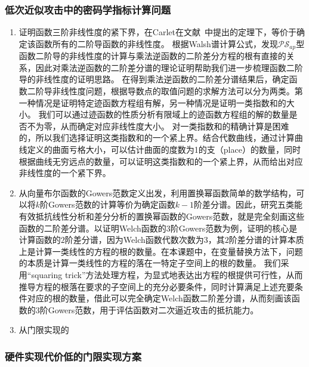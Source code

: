\documentclass[a4paper,zihao=-4,AutoFakeBold]{ctexart}
\begin{document}
\subsubsection{低次近似攻击中的密码学指标计算问题}
\begin{enumerate}[label=(\arabic{*})]
    \item 证明函数三阶非线性度的紧下界，在Carlet在文献~\cite{CC08IT}中提出的定理下，等价于确定该函数所有的二阶导函数的非线性度。
    根据Walsh谱计算公式，发现$\mathcal{PS}_{ap}$型函数二阶导的非线性度的计算与乘法逆函数的二阶差分方程的根有直接的关系，因此对乘法逆函数的二阶差分谱的理论证明帮助我们进一步梳理函数二阶导的非线性度的证明思路。
    在得到乘法逆函数的二阶差分谱结果后，确定函数二阶导非线性度问题，根据导数点的取值问题的求解方法可以分为两类。第一种情况是证明特定迹函数方程组有解，另一种情况是证明一类指数和的大小。
    我们可以通过迹函数的性质分析有限域上的迹函数方程组的解的数量是否不为零，从而确定对应非线性度大小。
    对一类指数和的精确计算是困难的，所以我们选择证明这类指数和的一个紧上界。结合代数曲线，通过计算曲线定义的曲面亏格大小，可以估计曲面的度数为1的支（place）的数量，同时根据曲线无穷远点的数量，可以证明这类指数和的一个紧上界，从而给出对应非线性度的一个紧下界。
    \item 从向量布尔函数的Gowers范数定义出发，利用置换幂函数简单的数学结构，可以将$k$阶Gowers范数的计算等价为确定函数$k-1$阶差分谱。因此，研究五类能有效抵抗线性分析和差分分析的置换幂函数的Gowers范数，就是完全刻画这些函数的二阶差分谱。以证明Welch函数的$3$阶Gowers范数为例，证明的核心是计算函数的$2$阶差分谱，因为Welch函数代数次数为$3$，其$2$阶差分谱的计算本质上是计算一类线性的方程的根的数量。在本课题中，在变量替换方法下，问题的本质是计算一类线性的方程的落在一特定子空间上的根的数量。
    我们采用``squaring trick''方法处理方程，为显式地表达出方程的根提供可行性，从而推导方程的根落在要求的子空间上的充分必要条件，同时计算满足上述充要条件对应的根的数量，借此可以完全确定Welch函数二阶差分谱，从而刻画该函数的$3$阶Gowers范数，用于评估函数对二次逼近攻击的抵抗能力。
    \item 从门限实现的
\end{enumerate}

\subsubsection{硬件实现代价低的门限实现方案}
\end{document}
